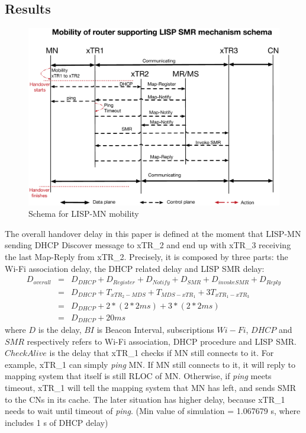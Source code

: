 \subsection{Results}
\label{sec:ns3_results_xTR}

\begin{figure}[!th]
	\centering
	\includegraphics[width=\textwidth]{Pics/Mobility_xTR_schema_SMR_simplify}
	\caption{Schema for LISP-MN mobility}
	\label{sim_schema}
\end{figure}

The overall handover delay in this paper is defined at the moment that LISP-MN sending DHCP Discover message to xTR\_2 and end up with xTR\_3 receiving the last Map-Reply from xTR\_2. Precisely, it is composed by three parts: the Wi-Fi association delay, the DHCP related delay and LISP SMR delay:
\begin{eqnarray}
D_{overall} &=& D_{DHCP} + D_{Register} + D_{Notify} + D_{SMR} + D_{invokeSMR} + D_{Reply} \nonumber \\
&=& D_{DHCP} +T_{xTR_2-MDS} + T_{MDS-xTR_1} + 3T_{xTR_1-xTR_3} \nonumber \\
&=& D_{DHCP} +2* (2*2ms) + 3*(2*2ms) \nonumber \\
&=& D_{DHCP} + 20 ms
\end{eqnarray}
where $D$ is the delay, $BI$ is Beacon Interval, subscriptions $Wi-Fi$, $DHCP$ and $SMR$ respectively refers to Wi-Fi association, DHCP procedure and LISP SMR. $CheckAlive$ is the delay that xTR\_1 checks if MN still connects to it. For example, xTR\_1 can simply \emph{ping} MN. If MN still connects to it, it will reply to mapping system that itself is still RLOC of MN. Otherwise, if \emph{ping} meets timeout, xTR\_1 will tell the mapping system that MN has left, and sends SMR to the CNs in its cache. The later situation has higher delay, because xTR\_1 needs to wait until timeout of \emph{ping}. (Min value of simulation = 1.067679 s, where includes 1 s of DHCP delay)

